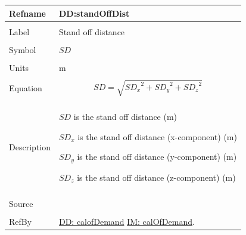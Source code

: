 \documentclass[12pt]{article}
\begin{document}
\noindent \begin{minipage}{\textwidth}
\begin{tabular}{p{} p{}}
\toprule \textbf{Refname} & \textbf{DD:standOffDist}
\label{DD:standOffDist}
\\ \midrule \\
Label & Stand off distance
        \\ \midrule \\
        Symbol & $SD$
                 \\ \midrule \\
                 Units & m
                         \\ \midrule \\
                         Equation & \begin{displaymath}
                                    SD=\sqrt{{SD_{x}}^{2}+{SD_{y}}^{2}+{SD_{z}}^{2}}
                                    \end{displaymath}
                                    \\ \midrule \\
                                    Description & \begin{symbDescription}
                                                  \item{$SD$ is the stand off distance (m)}
                                                  \item{${SD_{x}}$ is the stand off distance (x-component) (m)}
                                                  \item{${SD_{y}}$ is the stand off distance (y-component) (m)}
                                                  \item{${SD_{z}}$ is the stand off distance (z-component) (m)}
                                                  \end{symbDescription}
                                                  \\ \midrule \\
                                                  Source & \cite{astm2009}
                                                           \\ \midrule \\
                                                           RefBy & \hyperref[DD:calofDemand]{DD: calofDemand} \hyperref[IM:calOfDemand]{IM: calOfDemand}.
\\ \bottomrule \end{tabular}
\end{minipage}
\par~
\end{document}
